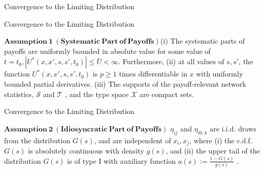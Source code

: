 \documentclass{beamer}		%
\begin{document}
\begin{frame}[noframenumbering]

\begin{itemize}

    \begin{LARGE}
    
    \item {}
    
    \item {}
    
    \item {}
    
    \item Convergence to the Limiting Distribution

    \end{LARGE}
    
\end{itemize}
	
\end{frame}











\begin{frame}{Convergence to the Limiting Distribution}



$\bm{Assumption\ 1\ (Systematic\ Part\ of\ Payoffs)}$(i) The systematic parts of payoffs are uniformly bounded in absolute value for some value of $t=t_0, |U^*(x,x',s,s',t_0)| \leq \bar{U} < \infty $. Furthermore, (ii) at all values of $s, s'$, the function $U^*(x,x',s,s',t_0)$ is $p \ge 1$ times differentiable in $x$ with uniformly bounded partial derivatives. (iii) The supports of the payoff-relevant network statistics, $\mathcal{S}$ and $\mathcal{T}$ , and the type space $\mathcal{X}$ are compact sets.




\end{frame}








\begin{frame}{Convergence to the Limiting Distribution}

$\bm{Assumption\ 2\ (Idiosyncratic\ Part\ of\ Payoffs)}$ $\eta_{ij}$ and $\eta_{i0,k}$ are i.i.d. draws from the distribution $G(s)$, and are independent of $x_i, x_j$, where (i) the c.d.f. $G(s)$ is absolutely continuous with density $g(s)$, and (ii) the upper tail of the distribution $G(s)$ is of type I with
auxiliary function $a(s):= \frac{1-G(s)}{g(s)}$ .




\end{frame}
\end{document}
